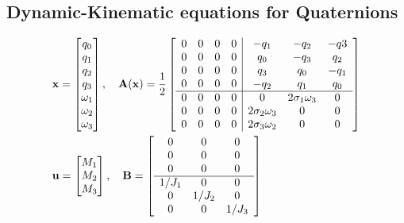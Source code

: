 \subsection{Dynamic-Kinematic equations for Quaternions}
\begin{equation}
    \begin{aligned}
        &\mathbf{x}=\begin{bmatrix}
            q_0\\q_1\\q_2\\q_3\\\omega_1\\\omega_2\\\omega_3
        \end{bmatrix}, \quad
        \mathbf{A(x)}=\frac{1}{2}
        \left[
        \begin{array}{c|c}
            \begin{matrix}
                0&0&0&0\\0&0&0&0\\0&0&0&0\\0&0&0&0\\
                \hline
                0&0&0&0\\0&0&0&0\\0&0&0&0\\
            \end{matrix}
            &
            \begin{matrix}
                -q_1&-q_2&-q3\\
                q_0&-q_3&q_2\\
                q_3&q_0&-q_1\\
                -q_2&q_1&q_0\\
                \hline
                0&2\sigma_1\omega_3&0\\
                2\sigma_2\omega_3&0&0\\
                2\sigma_3\omega_2&0&0
            \end{matrix} 
        \end{array}
        \right]\\\vspace{1cm}
        &\mathbf{u}=\begin{bmatrix}
            M_1\\M_2\\M_3
        \end{bmatrix}, \quad
        \mathbf{B}=
            \left[
                \begin{array}{c}
                    \begin{matrix}
                        0&0&0\\0&0&0\\0&0&0\\
                    \hline
                        1/J_1&0&0\\0&1/J_2&0\\0&0&1/J_3
                    \end{matrix}
                \end{array}
            \right]
    \end{aligned}
\end{equation}



